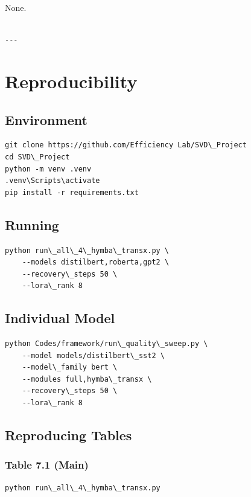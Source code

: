 None.
\begin{lstlisting}

---
\end{lstlisting}

\section{Reproducibility}

\subsection{Environment}

\begin{lstlisting}
git clone https://github.com/Efficiency Lab/SVD\_Project
cd SVD\_Project
python -m venv .venv
.venv\Scripts\activate
pip install -r requirements.txt
\end{lstlisting}

\subsection{Running}

\begin{lstlisting}
python run\_all\_4\_hymba\_transx.py \
    --models distilbert,roberta,gpt2 \
    --recovery\_steps 50 \
    --lora\_rank 8
\end{lstlisting}

\subsection{Individual Model}

\begin{lstlisting}
python Codes/framework/run\_quality\_sweep.py \
    --model models/distilbert\_sst2 \
    --model\_family bert \
    --modules full,hymba\_transx \
    --recovery\_steps 50 \
    --lora\_rank 8
\end{lstlisting}

\subsection{Reproducing Tables}

\subsubsection{Table 7.1 (Main)}
\begin{lstlisting}
python run\_all\_4\_hymba\_transx.py
\end{lstlisting}


